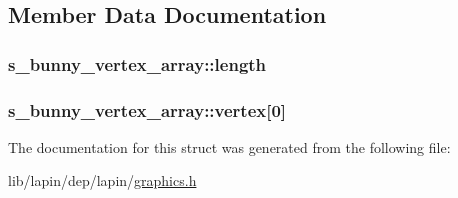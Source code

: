 \subsection{Member Data Documentation}
\hypertarget{structs__bunny__vertex__array_ac9aececfcb6b5d75089ddcaac5286c2b}{
\subsubsection[{length}]{ s\-\_\-bunny\-\_\-vertex\-\_\-array\-::length}}\label{structs__bunny__vertex__array_ac9aececfcb6b5d75089ddcaac5286c2b}
\hypertarget{structs__bunny__vertex__array_a6823a8c6591d86407701a66c03ea6907}{
\subsubsection[{vertex}]{ s\-\_\-bunny\-\_\-vertex\-\_\-array\-::vertex\mbox{[}0\mbox{]}}}\label{structs__bunny__vertex__array_a6823a8c6591d86407701a66c03ea6907}


The documentation for this struct was generated from the following file\-:\begin{DoxyCompactItemize}
\item 
lib/lapin/dep/lapin/\hyperlink{graphics_8h}{graphics.\-h}\end{DoxyCompactItemize}
